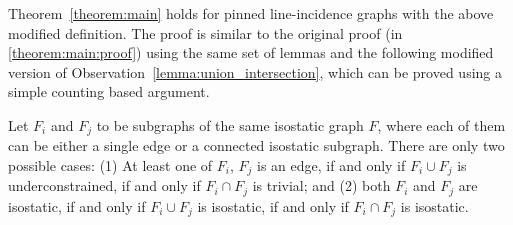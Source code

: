 Theorem~\ref{theorem:main} holds for  pinned line-incidence graphs with the above modified definition. The proof is similar to the original proof (in \ref{theorem:main:proof}) using the same set of lemmas and
%
%
the following modified version of Observation~\ref{lemma:union_intersection},
which  can be proved using a simple counting based argument.


\begin{observation}\label{lem:pinned_union_intersection}
    Let $F_i$ and $F_j$ to be subgraphs of the same isostatic graph $F$, where each of them can be either a single edge or a connected isostatic subgraph. There are only two possible cases:
    (1) At least one of $F_i$, $F_j$ is an edge, if and only if $F_i \cup F_j$ is underconstrained, if and only if $F_i \cap F_j$ is trivial; and (2) both $F_i$ and $F_j$ are isostatic, if and only if $F_i \cup F_j$ is isostatic, if and only if $F_i \cap F_j$ is isostatic.
\end{observation}


